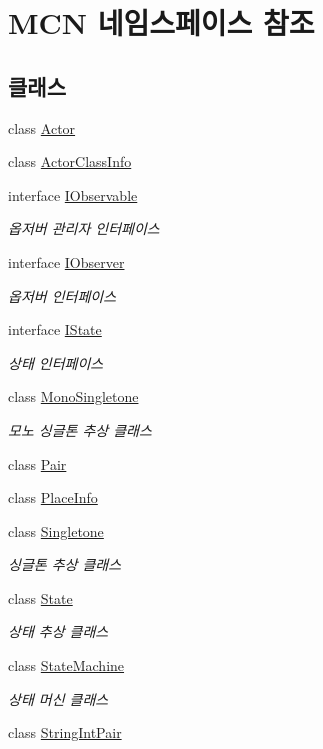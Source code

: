 \hypertarget{namespace_m_c_n}{}\section{M\+CN 네임스페이스 참조}
\label{namespace_m_c_n}
\subsection*{클래스}
\begin{DoxyCompactItemize}
\item 
class \hyperlink{class_m_c_n_1_1_actor}{Actor}
\item 
class \hyperlink{class_m_c_n_1_1_actor_class_info}{Actor\+Class\+Info}
\item 
interface \hyperlink{interface_m_c_n_1_1_i_observable}{I\+Observable}
\begin{DoxyCompactList}\small\item\em 옵저버 관리자 인터페이스 \end{DoxyCompactList}\item 
interface \hyperlink{interface_m_c_n_1_1_i_observer}{I\+Observer}
\begin{DoxyCompactList}\small\item\em 옵저버 인터페이스 \end{DoxyCompactList}\item 
interface \hyperlink{interface_m_c_n_1_1_i_state}{I\+State}
\begin{DoxyCompactList}\small\item\em 상태 인터페이스 \end{DoxyCompactList}\item 
class \hyperlink{class_m_c_n_1_1_mono_singletone}{Mono\+Singletone}
\begin{DoxyCompactList}\small\item\em 모노 싱글톤 추상 클래스 \end{DoxyCompactList}\item 
class \hyperlink{class_m_c_n_1_1_pair}{Pair}
\item 
class \hyperlink{class_m_c_n_1_1_place_info}{Place\+Info}
\item 
class \hyperlink{class_m_c_n_1_1_singletone}{Singletone}
\begin{DoxyCompactList}\small\item\em 싱글톤 추상 클래스 \end{DoxyCompactList}\item 
class \hyperlink{class_m_c_n_1_1_state}{State}
\begin{DoxyCompactList}\small\item\em 상태 추상 클래스 \end{DoxyCompactList}\item 
class \hyperlink{class_m_c_n_1_1_state_machine}{State\+Machine}
\begin{DoxyCompactList}\small\item\em 상태 머신 클래스 \end{DoxyCompactList}\item 
class \hyperlink{class_m_c_n_1_1_string_int_pair}{String\+Int\+Pair}
\end{DoxyCompactItemize}
